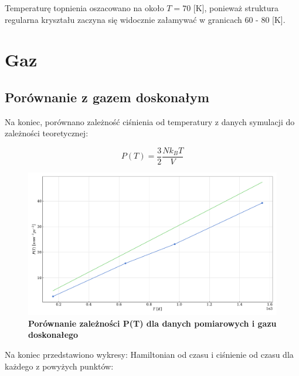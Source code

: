 \documentclass[11pt,a4paper]{article}
\begin{document}
Temperaturę topnienia oszacowano na około $T=70$ [K], ponieważ struktura regularna kryształu zaczyna się widocznie załamywać w granicach 60 - 80 [K].

\section{Gaz}

\subsection{Porównanie z gazem doskonałym}
Na koniec, porównano zależność ciśnienia od temperatury z danych symulacji do zależności teoretycznej:

$$
P(T) = \frac{3}{2} \frac{N k_B T}{V}
$$

\begin{figure}[ht!]
    \caption{\textbf{Porównanie zależności P(T) dla danych pomiarowych i gazu doskonałego}}
    \vspace{0.2cm}
    \includegraphics[width=\linewidth]{../figures/P_vs_T.pdf}
\end{figure}

Na koniec przedstawiono wykresy: Hamiltonian od czasu i ciśnienie od czasu dla każdego z powyżych punktów:
\end{document}
